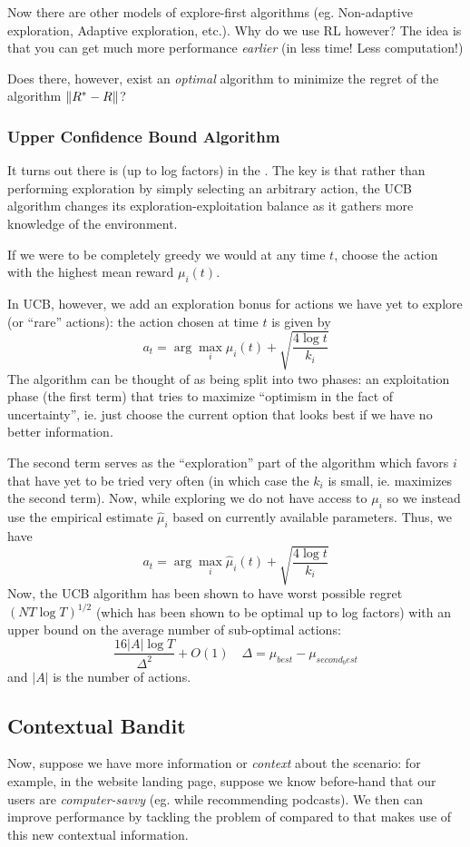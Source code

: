 \documentclass[11pt]{scrartcl}
\begin{document}
Now there are other models of explore-first algorithms (eg. Non-adaptive exploration, Adaptive exploration, etc.). Why do we use RL however? The idea is that you can get much more performance \textit{earlier} (in less time! Less computation!)

Does there, however, exist an \textit{optimal} algorithm to minimize the regret of the algorithm $\left\lVert R^*-R\right\rVert$? 

\subsubsection{Upper Confidence Bound Algorithm} 

It turns out there is (up to log factors) in the . The key is that rather than performing exploration by simply selecting an arbitrary action, the UCB algorithm changes its exploration-exploitation balance as it gathers more knowledge of the environment. 

If we were to be completely greedy we would at any time $t$, choose the action with the highest mean reward $\mu_i(t)$. 

In UCB, however, we add an exploration bonus for actions we have yet to explore (or ``rare'' actions):
the action chosen at time $t$ is given by $$a_{t}=\arg\max_{i} \mu_{i}(t)+\sqrt{\frac{4\log{t}}{k_i}}$$
The algorithm can be thought of as being split into two phases: an exploitation phase (the first term) that tries to maximize 
``optimism in the fact of uncertainty'', ie. just choose the current option that looks best if we have no better information. 

The second term serves as the ``exploration'' part of the algorithm which favors $i$ that have yet to be tried very often (in which case the $k_i$ is small, ie. maximizes the second term). Now, while exploring we do not have access to $\mu_i$ so we instead use the empirical estimate $\hat{\mu}_i$ based on currently available parameters. Thus, we have $$a_t=\arg\max_{i}\hat{\mu}_i(t)+\sqrt{\frac{4\log{t}}{k_i}}$$
Now, the UCB algorithm has been shown to have worst possible regret $(NT\log{T})^{1/2}$ (which has been shown to be optimal up to log factors) with an upper bound on the average number of sub-optimal actions: $$\frac{16|A|\log{T}}{\Delta^2}+O(1) \quad \Delta = \mu_{best}-\mu_{second_best}$$ and $|A|$ is the number of actions. 

\subsection{Contextual Bandit}
Now, suppose we have more information or \textit{context} about the scenario: for example, in the website landing page, suppose we know before-hand that our users are \textit{computer-savvy} (eg. while recommending podcasts). We then can improve performance by tackling the problem of  compared to  that makes use of this new contextual information.
\end{document}
